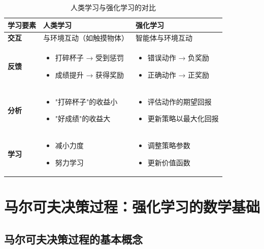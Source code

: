 \begin{table}[H]
\centering
\caption{人类学习与强化学习的对比}
\begin{tabular}{p{}p{}p{}}
\toprule
\textbf{学习要素} & \textbf{人类学习} & \textbf{强化学习} \\
\midrule
\textbf{交互} & 与环境互动（如触摸物体） & 智能体与环境互动 \\
\hline
\textbf{反馈} & 
\begin{itemize}
    \item 打碎杯子 → 受到惩罚
    \item 成绩提升 → 获得奖励
\end{itemize} & 
\begin{itemize}
    \item 错误动作 → 负奖励
    \item 正确动作 → 正奖励
\end{itemize} \\
\hline
\textbf{分析} & 
\begin{itemize}
    \item "打碎杯子"的收益小
    \item "好成绩"的收益大
\end{itemize} & 
\begin{itemize}
    \item 评估动作的期望回报
    \item 更新策略以最大化回报
\end{itemize} \\
\hline
\textbf{学习} & 
\begin{itemize}
    \item 减小力度
    \item 努力学习
\end{itemize} & 
\begin{itemize}
    \item 调整策略参数
    \item 更新价值函数
\end{itemize} \\
\bottomrule
\end{tabular}
\end{table}

\section{马尔可夫决策过程：强化学习的数学基础}

\subsection{马尔可夫决策过程的基本概念}

